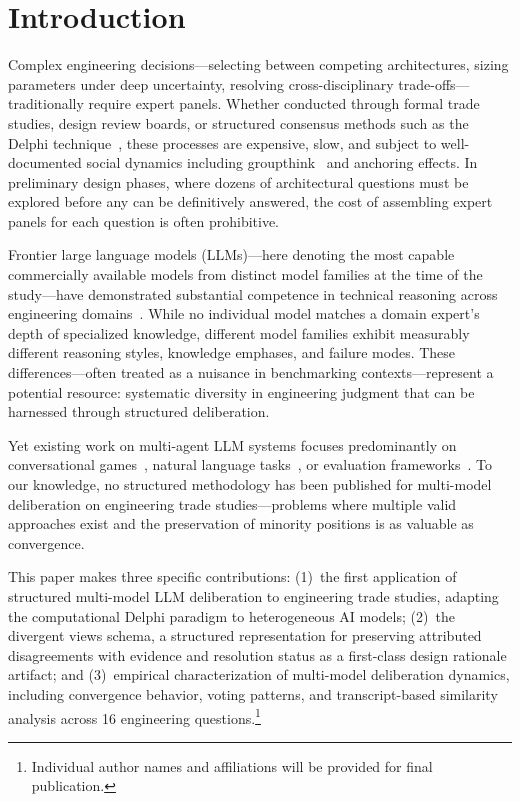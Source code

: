 \documentclass[11pt,a4paper]{article}
\begin{document}
\section{Introduction}
\label{sec:introduction}

Complex engineering decisions---selecting between competing architectures, sizing parameters under deep uncertainty, resolving cross-disciplinary trade-offs---traditionally require expert panels. Whether conducted through formal trade studies, design review boards, or structured consensus methods such as the Delphi technique~\cite{linstone1975delphi}, these processes are expensive, slow, and subject to well-documented social dynamics including groupthink~\cite{janis1982groupthink} and anchoring effects. In preliminary design phases, where dozens of architectural questions must be explored before any can be definitively answered, the cost of assembling expert panels for each question is often prohibitive.

Frontier large language models (LLMs)---here denoting the most capable commercially available models from distinct model families at the time of the study---have demonstrated substantial competence in technical reasoning across engineering domains~\cite{bubeck2023sparks,openai2024gpt4}. While no individual model matches a domain expert's depth of specialized knowledge, different model families exhibit measurably different reasoning styles, knowledge emphases, and failure modes. These differences---often treated as a nuisance in benchmarking contexts---represent a potential resource: systematic diversity in engineering judgment that can be harnessed through structured deliberation.

Yet existing work on multi-agent LLM systems focuses predominantly on conversational games~\cite{du2023debate}, natural language tasks~\cite{wu2023autogen}, or evaluation frameworks~\cite{zheng2024judging}. To our knowledge, no structured methodology has been published for multi-model deliberation on engineering trade studies---problems where multiple valid approaches exist and the preservation of minority positions is as valuable as convergence.

This paper makes three specific contributions: (1)~the first application of structured multi-model LLM deliberation to engineering trade studies, adapting the computational Delphi paradigm to heterogeneous AI models; (2)~the divergent views schema, a structured representation for preserving attributed disagreements with evidence and resolution status as a first-class design rationale artifact; and (3)~empirical characterization of multi-model deliberation dynamics, including convergence behavior, voting patterns, and transcript-based similarity analysis across 16 engineering questions.\footnote{Individual author names and affiliations will be provided for final publication.}
\end{document}
